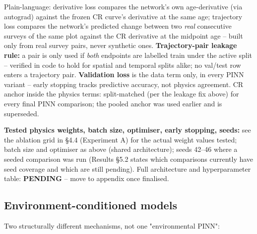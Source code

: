 Plain-language: derivative loss compares the network's own age-derivative (via autograd) against
the frozen CR curve's derivative at the same age; trajectory loss compares the network's predicted
change between two \emph{real} consecutive surveys of the same plot against the CR derivative at
the midpoint age -- built only from real survey pairs, never synthetic ones.
\textbf{Trajectory-pair leakage rule:} a pair is only used if \emph{both} endpoints are labelled
train under the active split -- verified in code to hold for spatial and temporal splits alike; no
val/test row enters a trajectory pair.
\textbf{Validation loss} is the data term only, in every PINN variant -- early stopping tracks
predictive accuracy, not physics agreement.
CR anchor inside the physics terms: split-matched (per the leakage fix above) for every final PINN
comparison; the pooled anchor was used earlier and is superseded.

\textbf{Tested physics weights, batch size, optimiser, early stopping, seeds:} see the ablation
grid in \S4.4 (Experiment A) for the actual weight values tested; batch size and optimiser as
above (shared architecture); seeds 42--46 where a seeded comparison was run (Results \S5.2 states
which comparisons currently have seed coverage and which are still pending). Full architecture and
hyperparameter table: \textbf{PENDING} -- move to appendix once finalised.

\subsection*{Environment-conditioned models}

Two structurally different mechanisms, not one "environmental PINN":

